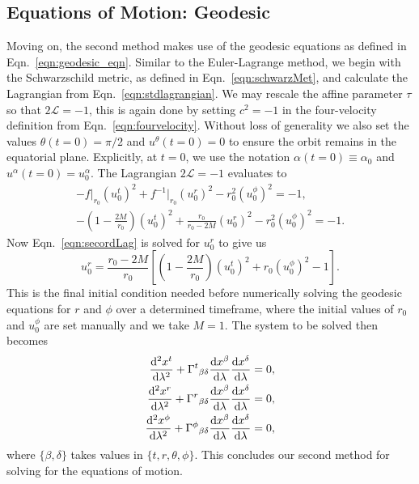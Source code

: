 
\subsection{Equations of Motion: Geodesic}
Moving on, the second method makes use of the geodesic equations as defined in Eqn.~\eqref{eqn:geodesic_eqn}.
Similar to the Euler-Lagrange method, we begin with the Schwarzschild metric, as defined in Eqn.~\eqref{eqn:schwarzMet}, and calculate the Lagrangian from Eqn.~\eqref{eqn:stdlagrangian}.
We may rescale the affine parameter $\tau$ so that $2\mathcal{L}=-1$, this is again done by setting $c^2=-1$ in the four-velocity definition from Eqn.~\eqref{eqn:fourvelocity}.
Without loss of generality we also set the values $\theta(t=0)=\pi/2$ and $u^{\theta}(t=0)=0$ to ensure the orbit remains in the equatorial plane.
Explicitly, at $t=0$, we use the notation $\alpha(t=0)\equiv\alpha_0$ and $u^\alpha(t=0)=u_0^\alpha$. The Lagrangian $2\mathcal{L}=-1$ evaluates to
\begin{gather}
    -f\vert_{r_0}(u_0^t)^2+f^{-1}\vert_{r_0}(u_0^r)^2-r_0^2(u_0^\phi)^2=-1,\\
    -\left(1-\frac{2M}{r_0}\right)(u_0^t)^2 +\frac{r_0}{r_0-2M}(u_0^r)^2-r_0^2(u_0^\phi)^2=-1. \label{eqn:secordLag}
\end{gather}
Now Eqn.~\eqref{eqn:secordLag} is solved for $u_0^{r}$ to give us
\begin{equation}
u_0^r=\frac{r_0-2M}{r_0}\left[\left(1-\frac{2M}{r_0}\right)(u_0^t)^2+r_0(u_0^\phi)^2-1 \right].
\end{equation}
This is the final initial condition needed before numerically solving the geodesic equations for $r$ and $\phi$ over a determined timeframe, where the initial values of $r_0$ and $u_0^\phi$ are set manually and we take $M=1$.
The system to be solved then becomes
\begin{align}
        \dv[2]{x^t}{\lambda}+\Gamma^{t}{}_{\beta\delta}\dv{x^\beta}{\lambda}\dv{x^\delta}{\lambda}=0,\\
        \dv[2]{x^r}{\lambda}+\Gamma^{r}{}_{\beta\delta}\dv{x^\beta}{\lambda}\dv{x^\delta}{\lambda}=0,\\
        \dv[2]{x^\phi}{\lambda}+\Gamma^{\phi}{}_{\beta\delta}\dv{x^\beta}{\lambda}\dv{x^\delta}{\lambda}=0,
\end{align}
where $\{\beta,\delta\}$ takes values in $\{t,r,\theta,\phi\}$.
This concludes our second method for solving for the equations of motion. 

